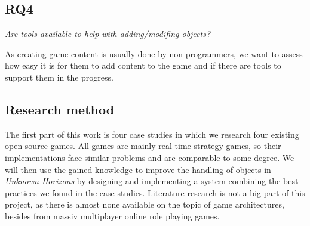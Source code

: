 \subsection{RQ4}
\textit{Are tools available to help with adding/modifing objects?}

As creating game content is usually done by non programmers, we want to assess how easy it is for them to add content to
the game and if there are tools to support them in the progress.

\subsection{Research method}
The first part of this work is four case studies in which we research four existing open source games. All games are
mainly real-time strategy games, so their implementations face similar problems and are comparable to some degree. We
will then use the gained knowledge to improve the handling of objects in \textit{Unknown Horizons} by designing and
implementing a system combining the best practices we found in the case studies. Literature research is not a big part
of this project, as there is almost none available on the topic of game architectures, besides from massiv
multiplayer online role playing games.
